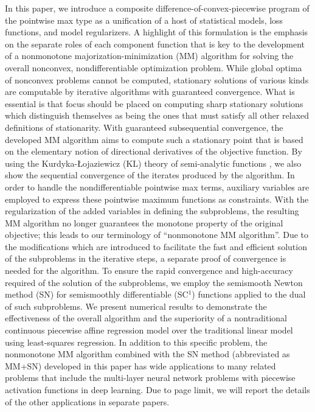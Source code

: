 \documentclass{siamart}
\begin{document}
In this paper, we introduce a composite difference-of-convex-piecewise program of the pointwise max type
as a unification of a host of statistical models, loss functions, and model regularizers.  A highlight
of this formulation is the emphasis on the separate roles of each component function that is
key to the development of a nonmonotone majorization-minimization (MM) algorithm for solving the overall nonconvex,
nondifferentiable optimization problem.
While global optima of nonconvex problems cannot be computed,
stationary solutions of various kinds are computable by iterative algorithms with guaranteed convergence.
What is essential is that focus should be placed on computing sharp stationary solutions which distinguish
themselves as being the ones that must satisfy all other relaxed definitions of stationarity.
With guaranteed subsequential convergence, the developed MM algorithm aims to compute
such a stationary point that is based on the elementary notion of directional derivatives of the objective function.
By using the Kurdyka-{\L}ojaziewicz (KL) theory of semi-analytic
functions \cite{AttouchBolte2009,AttouchBolteSvaiter2013,BoltePauwels2016}, we also show the sequential convergence
of the iterates produced by the algorithm.  In order to handle the nondifferentiable pointwise max terms,
auxiliary variables are employed to express these pointwise maximum functions as constraints.  With the regularization
of the added variables in defining the subproblems, the resulting MM algorithm no longer guarantees the monotone property
of the original objective; this leads to our terminology of ``nonmonotone MM algorithm''.  Due to the modifications
which are introduced to facilitate the fast and efficient solution of the subproblems in the iterative steps,
a separate proof of convergence is needed for the algorithm.   To ensure the rapid convergence and high-accuracy required of
the solution of the subproblems, we employ the semismooth Newton
method (SN) \cite{QiSun1993, PangQi1995} for semismoothly differentiable (SC$^1$)
functions applied to the dual of such subproblems.
We present numerical results to demonstrate the effectiveness of the overall algorithm and the superiority
of a nontraditional continuous piecewise affine regression model over the traditional linear model using least-squares regression.
In addition to this specific problem, the nonmonotone MM algorithm combined with the SN method (abbreviated as MM+SN)
developed in this paper has wide applications
to many related problems that include the multi-layer neural network problems with piecewise activation functions
in deep learning.  Due to page limit, we will report the details of the other applications in separate papers.
\end{document}
